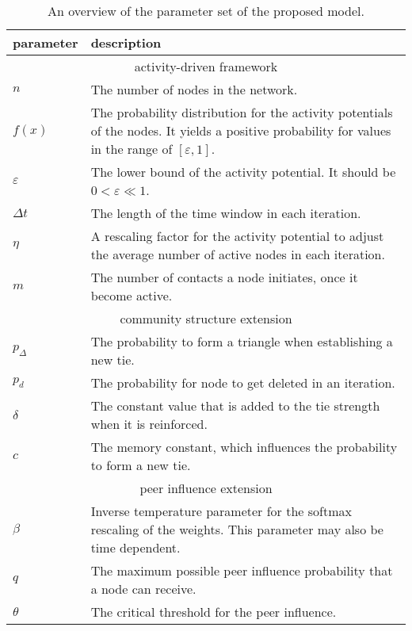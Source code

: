 \begin{table}
\centering
\begin{tabular}{lp{10cm}}
\toprule
\textbf{parameter} & \textbf{description} \\
\midrule
\multicolumn{2}{c}{activity-driven framework} \\
\midrule
\( n \) & The number of nodes in the network. \\
\( f(x) \) & The probability distribution for the activity potentials of the nodes. It yields a positive probability for values in the range of \( [\varepsilon, 1] \). \\
\( \varepsilon \) &  The lower bound of the activity potential. It should be \( 0 < \varepsilon \ll 1 \). \\
\( \Delta t \) &  The length of the time window in each iteration. \\
\( \eta \) &  A rescaling factor for the activity potential to adjust the average number of active nodes in each iteration. \\
\( m \) & The number of contacts a node initiates, once it become active. \\
\midrule
\multicolumn{2}{c}{community structure extension} \\
\midrule
\( p_{\Delta} \) & The probability to form a triangle when establishing a new tie. \\
\( p_{d} \) & The probability for node to get deleted in an iteration. \\
\( \delta \) & The constant value that is added to the tie strength when it is reinforced. \\
\( c \) &  The memory constant, which influences the probability to form a new tie.\\
\midrule
\multicolumn{2}{c}{peer influence extension} \\
\midrule
\( \beta \) & Inverse temperature parameter for the softmax rescaling of the weights. This parameter may also be time dependent. \\
\( q \) & The maximum possible peer influence probability that a node can receive. \\
\( \theta \) & The critical threshold for the peer influence. \\
\bottomrule
\end{tabular}

\caption[Overview proposed model parameter]{An overview of the parameter set of the proposed model.}
\label{tbl:all-model-parameter}
\end{table}
